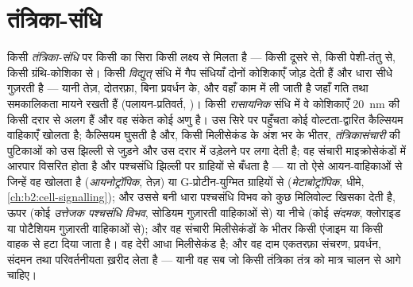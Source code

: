 \section{तंत्रिका-संधि}

\begin{definition}[रासायनिक और विद्युत् तंत्रिका-संधियाँ]\label{def:b2:neurons-synapses:synapse}
किसी \emph{तंत्रिका-संधि} पर किसी  का सिरा किसी लक्ष्य से मिलता है --- किसी दूसरे
 से, किसी पेशी-तंतु से, किसी ग्रंथि-कोशिका से। किसी \emph{विद्युत्}
संधि में गैप संधियाँ दोनों कोशिकाएँ जोड़ देती हैं और धारा सीधे गुज़रती है
--- यानी तेज़, दोतरफ़ा, बिना प्रवर्धन के, और वहाँ काम में ली जाती है जहाँ गति तथा
समकालिकता मायने रखती हैं (पलायन-प्रतिवर्त, )। किसी \emph{रासायनिक}
संधि में वे कोशिकाएँ \qty{20}{nm} की किसी दरार से अलग हैं और वह
संकेत कोई अणु है। उस सिरे पर पहुँचता कोई 
वोल्टता-द्वारित कैल्सियम वाहिकाएँ खोलता है; कैल्सियम घुसती है और, किसी
मिलीसेकंड के अंश भर के भीतर, \emph{तंत्रिकासंचारी} की पुटिकाओं को
उस झिल्ली से जुड़ने और उस दरार में उड़ेलने पर लगा देती है; वह संचारी
माइक्रोसेकंडों में आरपार विसरित होता है और पश्चसंधि झिल्ली पर ग्राहियों से
बँधता है --- या तो ऐसे आयन-वाहिकाओं से जिन्हें वह खोलता है
(\emph{आयनोट्रॉपिक}, तेज़) या G-प्रोटीन-युग्मित ग्राहियों से
(\emph{मेटाबोट्रॉपिक}, धीमे, \cref{ch:b2:cell-signalling}); और उससे
बनी धारा पश्चसंधि विभव को कुछ
मिलिवोल्ट खिसका देती है, ऊपर (कोई \emph{उत्तेजक पश्चसंधि विभव},
सोडियम गुज़ारती वाहिकाओं से) या नीचे (कोई \emph{संदमक}, क्लोराइड या
पोटैशियम गुज़ारती वाहिकाओं से); और वह संचारी
मिलीसेकंडों के भीतर किसी एंजाइम या किसी वाहक से हटा दिया जाता है। वह
देरी आधा मिलीसेकंड है; और वह दाम एकतरफ़ा संचरण,
प्रवर्धन, संदमन तथा परिवर्तनीयता ख़रीद लेता है --- यानी वह सब जो किसी
तंत्रिका तंत्र को मात्र चालन से आगे चाहिए।
\end{definition}


